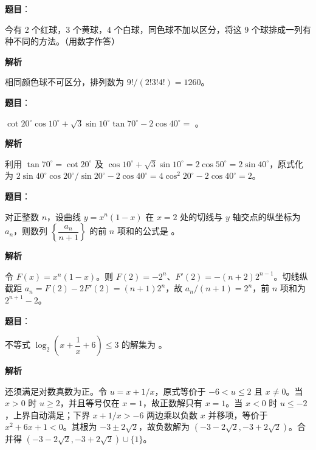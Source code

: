 \begin{answer}

\textbf{题目}：

今有 2 个红球，3 个黄球，4 个白球，同色球不加以区分，将这 9 个球排成一列有 \gkblank{} 种不同的方法。（用数字作答）

\textbf{解析}

相同颜色球不可区分，排列数为 $9!/(2!3!4!)=1260$。


\end{answer}
\begin{answer}

\textbf{题目}：

$\cot20^\circ\cos10^\circ+\sqrt3\sin10^\circ\tan70^\circ-2\cos40^\circ=$ \gkblank{}。

\textbf{解析}

利用 $\tan70^\circ=\cot20^\circ$ 及 $\cos10^\circ+\sqrt3\sin10^\circ=2\cos50^\circ=2\sin40^\circ$，原式化为 $2\sin40^\circ\cos20^\circ/\sin20^\circ-2\cos40^\circ=4\cos^2 20^\circ-2\cos40^\circ=2$。


\end{answer}
\begin{answer}

\textbf{题目}：

对正整数 $n$，设曲线 $y=x^n(1-x)$ 在 $x=2$ 处的切线与 $y$ 轴交点的纵坐标为 $a_n$，则数列 $\left\{\dfrac{a_n}{n+1}\right\}$ 的前 $n$ 项和的公式是 \gkblank{}。

\textbf{解析}

令 $F(x)=x^n(1-x)$。则 $F(2)=-2^n$、$F'(2)=-(n+2)2^{n-1}$。切线纵截距 $a_n=F(2)-2F'(2)=(n+1)2^n$，故 $a_n/(n+1)=2^n$，前 $n$ 项和为 $2^{n+1}-2$。


\end{answer}
\begin{answer}

\textbf{题目}：

不等式 $\log_2\left(x+\dfrac1x+6\right)\leqslant3$ 的解集为 \gkblank{}。

\textbf{解析}

还须满足对数真数为正。令 $u=x+1/x$，原式等价于 $-6<u\le2$ 且 $x\ne0$。当 $x>0$ 时 $u\ge2$，并且等号仅在 $x=1$，故正数解只有 $x=1$。当 $x<0$ 时 $u\le-2$，上界自动满足；下界 $x+1/x>-6$ 两边乘以负数 $x$ 并移项，等价于 $x^2+6x+1<0$。其根为 $-3\pm2\sqrt2$，故负数解为 $(-3-2\sqrt2,-3+2\sqrt2)$。合并得 $(-3-2\sqrt2,-3+2\sqrt2)\cup\{1\}$。


\end{answer}
